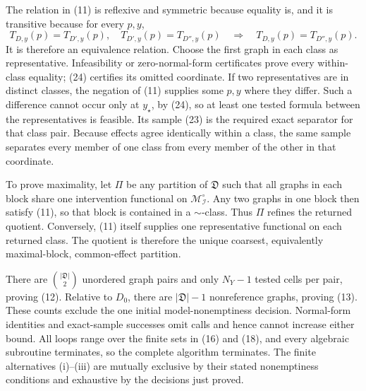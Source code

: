 The relation in (11) is reflexive and symmetric because equality is, and it is transitive because for every \(p,y\),
\[
 T_{D,y}(p)=T_{D',y}(p),\quad
 T_{D',y}(p)=T_{D'',y}(p)
 \quad\Longrightarrow\quad
 T_{D,y}(p)=T_{D'',y}(p). \tag{25}
\]
It is therefore an equivalence relation.  Choose the first graph in each class as representative.  Infeasibility or zero-normal-form certificates prove every within-class equality; (24) certifies its omitted coordinate.  If two representatives are in distinct classes, the negation of (11) supplies some \(p,y\) where they differ.  Such a difference cannot occur only at \(y_\star\), by (24), so at least one tested formula between the representatives is feasible.  Its sample (23) is the required exact separator for that class pair.  Because effects agree identically within a class, the same sample separates every member of one class from every member of the other in that coordinate.

To prove maximality, let \(\Pi\) be any partition of \(\mathfrak D\) such that all graphs in each block share one intervention functional on \(\mathcal M_{\mathcal I}^{\circ}\).  Any two graphs in one block then satisfy (11), so that block is contained in a \(\sim\)-class.  Thus \(\Pi\) refines the returned quotient.  Conversely, (11) itself supplies one representative functional on each returned class.  The quotient is therefore the unique coarsest, equivalently maximal-block, common-effect partition.

There are \(\binom{|\mathfrak D|}{2}\) unordered graph pairs and only \(N_Y-1\) tested cells per pair, proving (12).  Relative to \(D_0\), there are \(|\mathfrak D|-1\) nonreference graphs, proving (13).  These counts exclude the one initial model-nonemptiness decision.  Normal-form identities and exact-sample successes omit calls and hence cannot increase either bound.  All loops range over the finite sets in (16) and (18), and every algebraic subroutine terminates, so the complete algorithm terminates.  The finite alternatives (i)--(iii) are mutually exclusive by their stated nonemptiness conditions and exhaustive by the decisions just proved.

